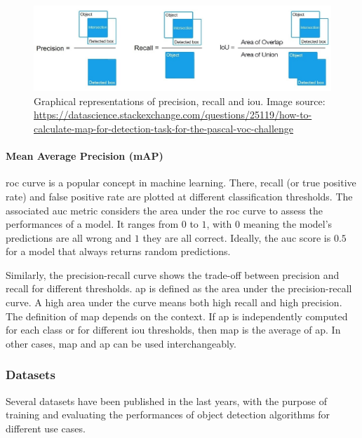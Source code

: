 \documentclass[%
    corpo=12pt,
    twoside,
    stile=classica,   
    tipotesi=magistrale,
    evenboxes,
    english,
	numerazioneromana,
]{toptesi}
\begin{document}
\begin{figure}[t]
	\centering
	\includegraphics[width=\linewidth]{imgs/precision_recall_iou.jpg}
	\caption[Graphical representations of precision, recall and \gls{iou}]{Graphical representations of precision, recall and \gls{iou}. Image source: \url{https://datascience.stackexchange.com/questions/25119/how-to-calculate-map-for-detection-task-for-the-pascal-voc-challenge}}
	\label{fig:iou}
\end{figure}

\paragraph{Mean Average Precision (mAP)}
\gls{roc} curve is a popular concept in machine learning. There, recall (or true positive rate) and false positive rate are plotted at different classification thresholds. The associated \gls{auc} metric considers the area under the \gls{roc} curve to assess the performances of a model.\cite{roc} It ranges from $ 0 $ to $ 1 $, with $ 0 $ meaning the model's predictions are all wrong and $ 1 $ they are all correct. Ideally, the \gls{auc} score is $ 0.5 $ for a model that always returns random predictions.

Similarly, the precision-recall curve shows the trade-off between precision and recall for different thresholds\cite{precrecall}. \gls{ap} is defined as the area under the precision-recall curve. A high area under the curve means both high recall and high precision. The definition of \gls{map} depends on the context. If \gls{ap} is independently computed for each class or for different \gls{iou} thresholds, then \gls{map} is the average of \gls{ap}. In other cases, \gls{map} and \gls{ap} can be used interchangeably.


\subsubsection{Datasets}\label{sec:datasets}
Several datasets have been published in the last years, with the purpose of training and evaluating the performances of object detection algorithms for different use cases.
\end{document}
